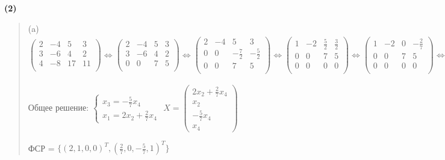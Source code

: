 \documentclass{article}
\begin{document}
\textbf{\textsf{(2)}}
\begin{quote}
    (a) $
    \begin{pmatrix}
       2 & -4 & 5 & 3 \\ 
       3 & -6 & 4 & 2 \\ 
       4 & -8 & 17 & 11 \\ 
    \end{pmatrix} \Leftrightarrow
        \begin{pmatrix}
       2 & -4 & 5 & 3 \\ 
       3 & -6 & 4 & 2 \\ 
       0 & 0 & 7 & 5 \\ 
    \end{pmatrix} \Leftrightarrow
    \begin{pmatrix}
       2 & -4 & 5 & 3 \\ 
       0 & 0 & -\frac{7}{2} & -\frac{5}{2} \\ 
       0 & 0 & 7 & 5 \\ 
    \end{pmatrix} \Leftrightarrow
        \begin{pmatrix}
       1 & -2 & \frac{5}{2} & \frac{3}{2} \\ 
       0 & 0 & 7 & 5 \\ 
       0 & 0 & 0 & 0 \\ 
    \end{pmatrix} \Leftrightarrow
            \begin{pmatrix}
       1 & -2 & 0 & -\frac{2}{7} \\ 
       0 & 0 & 7 & 5 \\ 
       0 & 0 & 0 & 0 \\ 
    \end{pmatrix} \Leftrightarrow
                \begin{pmatrix}
       1 & -2 & 0 & -\frac{2}{7} \\ 
       0 & 0 & 1 & \frac{5}{7} \\ 
       0 & 0 & 0 & 0 \\ 
    \end{pmatrix} 
    $
    
    Общее решение: $\begin{cases} x_3 = -\frac{5}{7} x_4 \\ x_1 = 2x_2 + \frac{2}{7} x_4\end{cases}$ $X = \begin{pmatrix}2x_2 + \frac{2}{7}x_4 \\ 
                          x_2 \\ -\frac{5}{7} x_4 \\ x_4 \end{pmatrix}$

    ФСР = $\{(2, 1, 0 , 0)^T , (\frac{2}{7}, 0, -\frac{5}{7}, 1)^T \}$
\end{quote}
\end{document}
